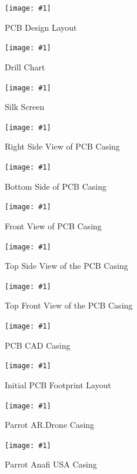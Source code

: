 \documentclass[12pt]{article}
\newcommand{\quickfigure}[4]{%
\begin{figure}[!htbp]
\centering
\texttt{[image: \#1]}
\caption{#3}
\label{#4}
\end{figure}%
}
\begin{document}
\newpage
\quickfigure{pcb-design-layout.png}{15cm}{PCB Design Layout}{pcb-design-layout}

\quickfigure{images/drill-chart.png}{15cm}{Drill Chart}{drill-chart}

\quickfigure{images/silk-screen.png}{15cm}{Silk Screen}{silk-screen}

\quickfigure{images/right-side-of-PCB-casing.png}{15cm}{Right Side View of PCB Casing}{right-side-view-pcb-casing}

\quickfigure{images/bottom-side-of-PCB-casing.png}{15cm}{Bottom Side of PCB Casing}{bottom-side-pcb-casing}

\quickfigure{images/front-view-of-PCB-casing.png}{15cm}{Front View of PCB Casing}{front-view-pcb-casing}

\quickfigure{images/top-view-PCB-casing-open.png}{15cm}{Top Side View of the PCB Casing}{top-side-view-pcb-casing}

\quickfigure{images/top-front-view-PCB-casing-open.png}{15cm}{Top Front View of the PCB Casing}{top-front-view-pcb-casing}

\quickfigure{images/PCB-CAD-drawing.png}{15cm}{PCB CAD Casing}{pcb-cad-casing}

\quickfigure{images/initial-PCB-footprint-layout.png}{15cm}{Initial PCB Footprint Layout}{initial-pcb-footprint-layout}

\quickfigure{images/parrot-AR-drone-casing.jpg}{15cm}{Parrot AR.Drone Casing}{parrot-ardrone-casing}

\quickfigure{images/parrot-anafi-USA-casing.jpg}{15cm}{Parrot Anafi USA Casing}{parrot-anafi-usa-casing}
\end{document}
